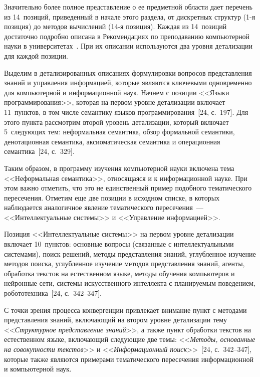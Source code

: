 \begin{multicols}{2}
      Значительно более полное представление о ее предметной области дает перечень из
14~позиций, приведенный в начале этого раздела, от дискретных структур (1-я позиция) до
методов вычислений (14-я позиция). Каждая из 14~позиций достаточно подробно описана в
Рекомендациях по преподаванию компьютерной науки в университетах~\cite{24za}.
При их описании используются два уровня детализации для каждой позиции.

      Выделим в детализированных описаниях формулировки вопросов представления знаний
и управ\-ле\-ния информацией, которые являются ключевыми одновременно для компьютерной и
информационной наук. Начнем с позиции <<Языки программирования>>, которая на первом
уровне детализации включает 11~пунктов, в том числе семантику языков
программирования~[24, с.~197]. Для этого пункта рассмотрим второй уровень
детализации, который включает 5~следующих тем: неформальная семантика, обзор
формальной семантики, денотационная семантика, аксиоматическая семантика и операционная
семантика~[24, с.~329].

      Таким образом, в программу изучения компьютерной науки включена тема
<<Неформальная семан\-ти\-ка>>, относящаяся и к информационной
науке. При этом важно
отметить, что это не единственный пример подобного тематического пересечения. Отметим
еще две позиции в исходном списке, в которых наблюдается аналогичное явление
тематического пересечения~--- <<Интеллектуальные системы>> и <<Управление
информацией>>.

      Позиция <<Интеллектуальные системы>> на первом уровне детализации включает
10~пунктов: основные вопросы (связанные с интеллектуальными системами), поиск решений,
методы пред\-став\-ле\-ния знаний, углубленное изучение методов поиска, углубленное изучение
методов представления знаний, агенты, обработка текстов на естественном языке, методы
обучения компьютеров и нейронные сети, системы искусственного интеллекта с планируемым
поведением, робототехника~[24, с.~342--347].

      С точки зрения процесса конвергенции привлекает внимание пункт с методами
представления знаний, включающий на втором уровне детализации тему
<<\textit{Структурное представление знаний}>>, а также пункт обработки текстов на
естественном языке, включающий следующие две темы: <<\textit{Методы, основанные на
совокупности текстов}>> и <<\textit{Информационный поиск}>>~[24, с.~342--347], 
которые также являются примерами тематического пересечения
информационной и компьютерной наук.


\end{multicols}
